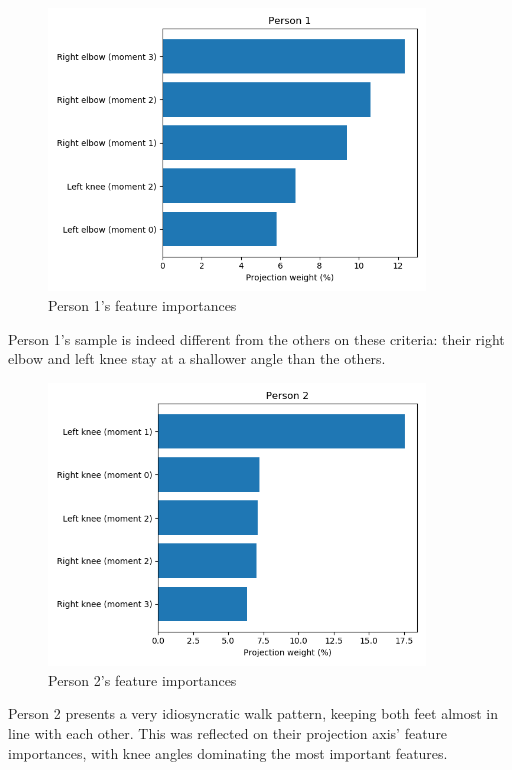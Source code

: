 \documentclass{bmvc2k}
\begin{document}
\begin{figure}[H]
   \begin{center}
      \includegraphics[width=10cm]{figures/person1Imp.png}
      \caption{Person 1's feature importances}
   \end{center}
\end{figure}
Person 1's sample is indeed different from the others on these criteria: their right elbow and left knee stay at a shallower angle than the others.

\begin{figure}[H]
   \begin{center}
      \includegraphics[width=10cm]{figures/person2Imp.png}
      \caption{Person 2's feature importances}
   \end{center}
\end{figure}
Person 2 presents a very idiosyncratic walk pattern, keeping both feet almost in line with each other. This was reflected on their projection axis' feature importances, with knee angles dominating the most important features.
\end{document}
